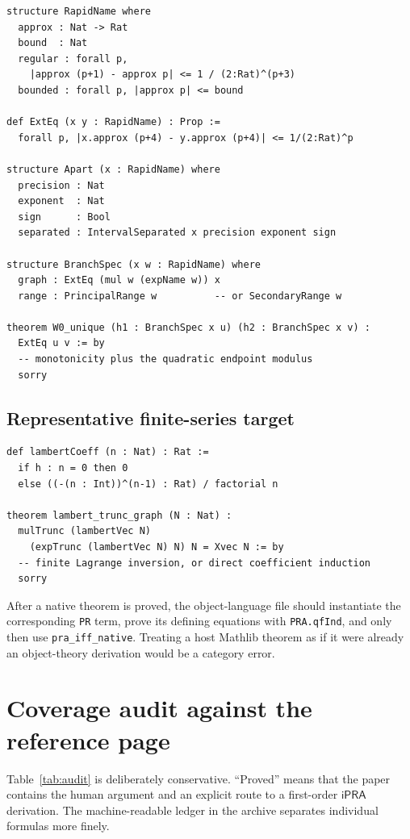 \documentclass[11pt]{article}
\theoremstyle{definition}
\newcommand{\iPRA}{\mathsf{iPRA}}
\newcommand{\code}[1]{\nolinkurl{#1}}
\begin{document}
\begin{lstlisting}[language={}] 
structure RapidName where
  approx : Nat -> Rat
  bound  : Nat
  regular : forall p,
    |approx (p+1) - approx p| <= 1 / (2:Rat)^(p+3)
  bounded : forall p, |approx p| <= bound

def ExtEq (x y : RapidName) : Prop :=
  forall p, |x.approx (p+4) - y.approx (p+4)| <= 1/(2:Rat)^p

structure Apart (x : RapidName) where
  precision : Nat
  exponent  : Nat
  sign      : Bool
  separated : IntervalSeparated x precision exponent sign

structure BranchSpec (x w : RapidName) where
  graph : ExtEq (mul w (expName w)) x
  range : PrincipalRange w          -- or SecondaryRange w

theorem W0_unique (h1 : BranchSpec x u) (h2 : BranchSpec x v) :
  ExtEq u v := by
  -- monotonicity plus the quadratic endpoint modulus
  sorry
\end{lstlisting}

\subsection{Representative finite-series target}

\begin{lstlisting}[language={}]
def lambertCoeff (n : Nat) : Rat :=
  if h : n = 0 then 0
  else ((-(n : Int))^(n-1) : Rat) / factorial n

theorem lambert_trunc_graph (N : Nat) :
  mulTrunc (lambertVec N)
    (expTrunc (lambertVec N) N) N = Xvec N := by
  -- finite Lagrange inversion, or direct coefficient induction
  sorry
\end{lstlisting}

After a native theorem is proved, the object-language file should instantiate
the corresponding \code{PR} term, prove its defining equations with
\code{PRA.qfInd}, and only then use \code{pra_iff_native}.  Treating a host
Mathlib theorem as if it were already an object-theory derivation would be a
category error.

\section{Coverage audit against the reference page}\label{sec:audit}

Table~\ref{tab:audit} is deliberately conservative.  ``Proved'' means that the
paper contains the human argument and an explicit route to a first-order
\(\iPRA\) derivation.  The machine-readable ledger in the archive separates
individual formulas more finely.
\end{document}
